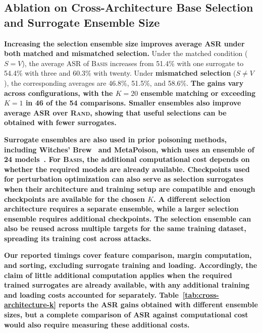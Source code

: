 \subsection{Ablation on Cross-Architecture \textbf{Base Selection} and Surrogate Ensemble Size}
\label{sec:cross-architecture-transfer}



\textbf{Increasing the selection ensemble size improves average ASR under both matched and mismatched selection.} Under the matched condition ($S=V$), the average ASR of \textsc{Basis} increases from 51.4\% with one surrogate to 54.4\% with three and 60.3\% with twenty. Under \textbf{mismatched selection} ($S\neq V$), the corresponding averages are 46.8\%, 51.5\%, and 58.6\%. \textbf{The gains vary across configurations, with the $K=20$ ensemble matching or exceeding $K=1$ in 46 of the 54 comparisons. Smaller ensembles also improve average ASR over \textsc{Rand}, showing that useful selections can be obtained with fewer surrogates.}

\textbf{Surrogate ensembles are also used in prior poisoning methods, including Witches' Brew~\cite{geiping2020witches} and MetaPoison, which uses an ensemble of 24 models~\cite{huang2020metapoison}. For \textsc{Basis}, the additional computational cost depends on whether the required models are already available. Checkpoints used for perturbation optimization can also serve as selection surrogates when their architecture and training setup are compatible and enough checkpoints are available for the chosen $K$. A different selection architecture requires a separate ensemble, while a larger selection ensemble requires additional checkpoints. The selection ensemble can also be reused across multiple targets for the same training dataset, spreading its training cost across attacks.}

\textbf{Our reported timings cover feature comparison, margin computation, and sorting, excluding surrogate training and loading. Accordingly, the claim of little additional computation applies when the required trained surrogates are already available, with any additional training and loading costs accounted for separately. Table~\ref{tab:cross-architecture-k} reports the ASR gains obtained with different ensemble sizes, but a complete comparison of ASR against computational cost would also require measuring these additional costs.}